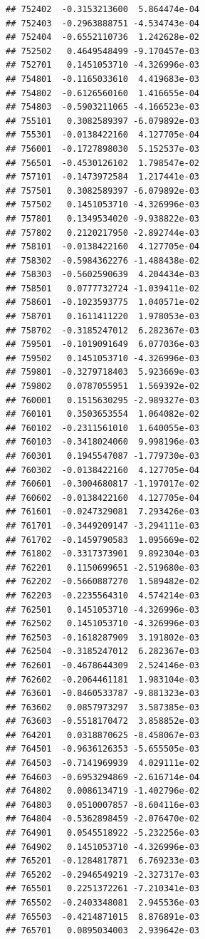 \documentclass[ignorenonframetext,]{beamer}
\begin{document}
\begin{frame}[fragile]
\begin{verbatim}
## 752402  -0.3153213600  5.864474e-04
## 752403  -0.2963888751 -4.534743e-04
## 752404  -0.6552110736  1.242628e-02
## 752502   0.4649548499 -9.170457e-03
## 752701   0.1451053710 -4.326996e-03
## 754801  -0.1165033610  4.419683e-03
## 754802  -0.6126560160  1.416655e-04
## 754803  -0.5903211065 -4.166523e-03
## 755101   0.3082589397 -6.079892e-03
## 755301  -0.0138422160  4.127705e-04
## 756001  -0.1727898030  5.152537e-03
## 756501  -0.4530126102  1.798547e-02
## 757101  -0.1473972584  1.217441e-03
## 757501   0.3082589397 -6.079892e-03
## 757502   0.1451053710 -4.326996e-03
## 757801   0.1349534020 -9.938822e-03
## 757802   0.2120217950 -2.892744e-03
## 758101  -0.0138422160  4.127705e-04
## 758302  -0.5984362276 -1.488438e-02
## 758303  -0.5602590639  4.204434e-03
## 758501   0.0777732724 -1.039411e-02
## 758601  -0.1023593775  1.040571e-02
## 758701   0.1611411220  1.978053e-03
## 758702  -0.3185247012  6.282367e-03
## 759501  -0.1019091649  6.077036e-03
## 759502   0.1451053710 -4.326996e-03
## 759801  -0.3279718403  5.923669e-03
## 759802   0.0787055951  1.569392e-02
## 760001   0.1515630295 -2.989327e-03
## 760101   0.3503653554  1.064082e-02
## 760102  -0.2311561010  1.640055e-03
## 760103  -0.3418024060  9.998196e-03
## 760301   0.1945547087 -1.779730e-03
## 760302  -0.0138422160  4.127705e-04
## 760601  -0.3004680817 -1.197017e-02
## 760602  -0.0138422160  4.127705e-04
## 761601  -0.0247329081  7.293426e-03
## 761701  -0.3449209147 -3.294111e-03
## 761702  -0.1459790583  1.095669e-02
## 761802  -0.3317373901  9.892304e-03
## 762201   0.1150699651 -2.519680e-03
## 762202  -0.5660887270  1.589482e-02
## 762203  -0.2235564310  4.574214e-03
## 762501   0.1451053710 -4.326996e-03
## 762502   0.1451053710 -4.326996e-03
## 762503  -0.1618287909  3.191802e-03
## 762504  -0.3185247012  6.282367e-03
## 762601  -0.4678644309  2.524146e-03
## 762602  -0.2064461181  1.983104e-03
## 763601  -0.8460533787 -9.881323e-03
## 763602   0.0857973297  3.587385e-03
## 763603  -0.5518170472  3.858852e-03
## 764201   0.0318870625 -8.458067e-03
## 764501  -0.9636126353 -5.655505e-03
## 764503  -0.7141969939  4.029111e-02
## 764603  -0.6953294869 -2.616714e-04
## 764802   0.0086134719 -1.402796e-02
## 764803   0.0510007857 -8.604116e-03
## 764804  -0.5362898459 -2.076470e-02
## 764901   0.0545518922 -5.232256e-03
## 764902   0.1451053710 -4.326996e-03
## 765201  -0.1284817871  6.769233e-03
## 765202  -0.2946549219 -2.327317e-03
## 765501   0.2251372261 -7.210341e-03
## 765502  -0.2403348081  2.945536e-03
## 765503  -0.4214871015  8.876891e-03
## 765701   0.0895034003  2.939642e-03

\end{verbatim}
\end{frame}
\end{document}
